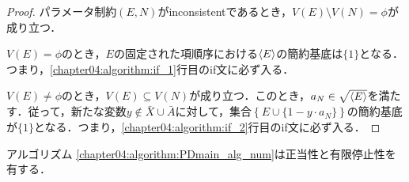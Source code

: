 \begin{proof}
	パラメータ制約$(E, N)$がinconsistentであるとき，$V(E) \setminus V(N) = \phi$が成り立つ．
	\par
	$V(E) = \phi$のとき，$E$の固定された項順序における$\langle E \rangle$の簡約\groebner{}基底は$\{1\}$となる．つまり，\ref{chapter04:algorithm:if_1}行目のif文に必ず入る．
	\par
	$V(E) \ne \phi$のとき，$V(E) \subseteq V(N)$が成り立つ．このとき，$a_N \in \sqrt{\langle E \rangle}$を満たす．従って，新たな変数$y \notin \bar{X}\cup \bar{A}$に対して，集合$\left\{E \cup \{1 - y \cdot a_N\}\right\}$の簡約\groebner{}基底が$\{1\}$となる．つまり，\ref{chapter04:algorithm:if_2}行目のif文に必ず入る．

\end{proof}

\begin{theorem}
	アルゴリズム \ref{chapter04:algorithm:PDmain_alg_num}は正当性と有限停止性を有する．
\end{theorem}

